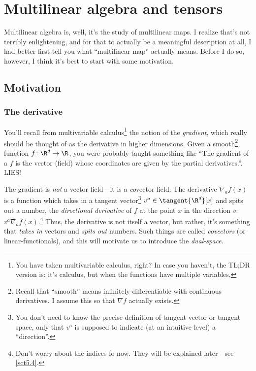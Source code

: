\chapter{Multilinear algebra and tensors}

Multilinear algebra is, well, it's the study of multilinear maps.  I realize that's not terribly enlightening, and for that to actually be a meaningful description at all, I had better first tell you what ``multilinear map'' actually means.  Before I do so, however, I think it's best to start with some motivation.

\section{Motivation}

\subsection{The derivative}

You'll recall from multivariable calculus\footnote{You have taken multivariable calculus, right?  In case you haven't, the TL;DR version is:  it's calculus, but when the functions have multiple variables.} the notion of the \emph{gradient}, which really should be thought of as the derivative in higher dimensions.  Given a smooth\footnote{Recall that ``smooth'' means infinitely-differentiable with continuous derivatives.  I assume this so that $\nabla f$ actually exists.} function $f\colon \R ^d\rightarrow \R$, you were probably taught something like ``The gradient of a $f$ is the vector (field) whose coordinates are given by the partial derivatives.''.  LIES!

The gradient is \emph{not} a vector field---it is a \emph{co}vector field.  The derivative $\nabla _af(x)$ is a function which takes in a tangent vector\footnote{You don't need to know the precise definition of tangent vector or tangent space, only that $v^a$ is supposed to indicate (at an intuitive level) a ``direction''.} $v^a\in \tangent{\R ^d}[x]$ and spits out a number, the \emph{directional derivative} of $f$ at the point $x$ in the direction $v$:  $v^a\nabla _af(x)$.\footnote{Don't worry about the indices fo now.  They will be explained later---see \cref{sct5.4}.}  Thus, the derivative is not itself a vector, but rather, it's something that \emph{takes in} vectors and \emph{spits out} numbers.  Such things are called \emph{covectors} (or linear-functionals), and this will motivate us to introduce the \emph{dual-space}.


